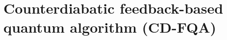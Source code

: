 \documentclass[twocolumn,aps,superscriptaddress,floatfix,longbibliography]{revtex4-2}
\begin{document}




\section{Counterdiabatic feedback-based quantum algorithm (CD-FQA)}
\label{sec:CD-FQA}
\end{document}
